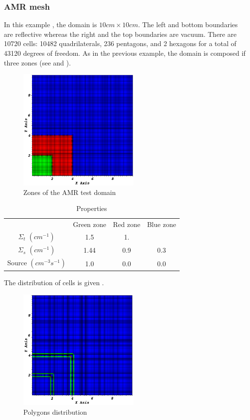 \subsubsection{AMR mesh}
In this example \cite{mip}, the domain is $10cm\times 10cm$. The left and bottom
boundaries are reflective whereas the right and the top boundaries are vacuum. 
There are 10720 cells: 10482 quadrilaterals, 236 pentagons,
and 2 hexagons for a total of 43120 degrees of freedom. 
As in the previous example, the domain is composed if three zones (see
 and ).
\begin{figure}[H]
  \centering
  \includegraphics[width=6cm]{zone_amr}
  \caption{Zones of the AMR test domain}
  \label{zone_amr}
\end{figure}
\begin{table}
  \begin{center}
    \caption{Properties}
    \begin{tabular}{|c|c|c|c|}
      \hline
      & Green zone & Red zone & Blue zone \\
    $\Sigma_t$ $(cm^{-1})$ & 1.5 & 1. \\
    $\Sigma_s$ $(cm^{-1})$ & 1.44 & 0.9 & 0.3 \\
  Source $(cm^{-3}s^{-1})$ & 1.0 & 0.0 & 0.0 \\
      \hline
    \end{tabular}
    \label{prop_amr}
  \end{center}
\end{table}
The distribution of cells is given .
\begin{figure}[H]
  \centering
  \includegraphics[width=6cm]{polygon_amr}
  \caption{Polygons distribution}
  \label{fig_pol_dist}
\end{figure}
